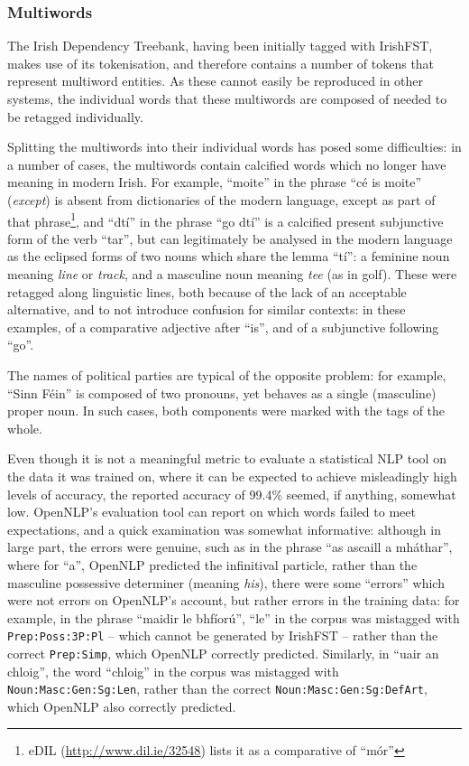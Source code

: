 \subsubsection{Multiwords}

The Irish Dependency Treebank, having been initially tagged with IrishFST, makes use of its tokenisation, and therefore
contains a number of tokens that represent multiword entities. As these cannot easily be reproduced in
other systems, the individual words that these multiwords are composed of needed to be retagged 
individually.

Splitting the multiwords into their individual words has posed some difficulties: in a number of cases, 
the multiwords contain calcified words which no longer have meaning in modern Irish. For example, 
``moite'' in the phrase ``c\'e is moite'' (\textit{except}) is absent from dictionaries of the 
modern language, except as part of that phrase\footnote{eDIL (\href{http://www.dil.ie/32548}{http://www.dil.ie/32548}) lists it as a comparative of ``m\'or''}, 
and ``dt\'i'' in the phrase ``go dt\'i'' is a calcified present subjunctive form of the verb ``tar'', 
but can legitimately be analysed in the modern language as the eclipsed forms of two nouns which 
share the lemma ``t\'i'': a feminine noun meaning \textit{line} or \textit{track}, and a masculine 
noun meaning \textit{tee} (as in golf). These were retagged along linguistic lines, both because
of the lack of an acceptable alternative, and to not introduce confusion for similar contexts: in
these examples, of a comparative adjective after ``is'', and of a subjunctive following ``go''.

The names of political parties are typical of the opposite problem: for example, ``Sinn F\'ein'' is
composed of two pronouns, yet behaves as a single (masculine) proper noun. In such cases, both
components were marked with the tags of the whole.

Even though it is not a meaningful metric to evaluate a statistical NLP tool on the data it was trained on,
where it can be expected to achieve misleadingly high levels of accuracy, the reported accuracy of 99.4\%
seemed, if anything, somewhat low. OpenNLP's evaluation tool can report on which words failed to meet
expectations, and a quick examination was somewhat informative: although in large part, the errors were 
genuine, such as in the phrase ``as ascaill a mháthar'', where for ``a'', OpenNLP predicted the infinitival 
particle, rather than the masculine possessive determiner (meaning \textit{his}), there were some ``errors''
which were not errors on OpenNLP's account, but rather errors in the training data: for example, in the phrase
``maidir le bhfíorú'', ``le'' in the corpus was mistagged with \texttt{Prep:Poss:3P:Pl} -- which cannot be 
generated by IrishFST -- rather than the correct \texttt{Prep:Simp}, which OpenNLP correctly predicted. 
Similarly, in ``uair an chloig'', the word ``chloig'' in the corpus was mistagged with 
\texttt{Noun:Masc:Gen:Sg:Len}, rather than the correct \texttt{Noun:Masc:Gen:Sg:DefArt}, which OpenNLP also 
correctly predicted.

